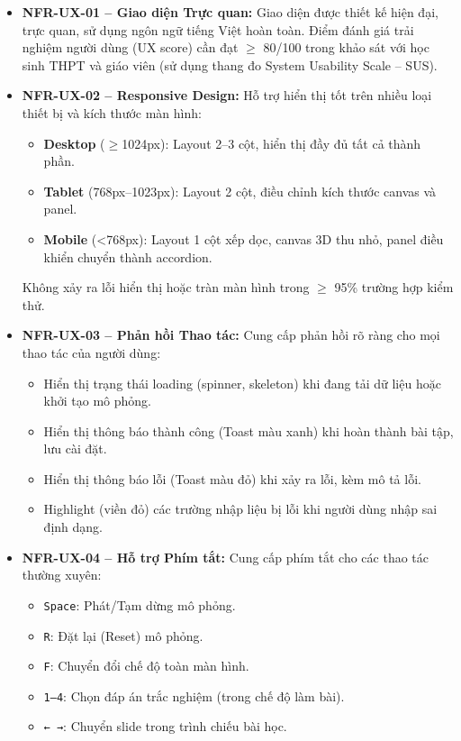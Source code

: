 \begin{itemize}
    \item \textbf{NFR-UX-01 – Giao diện Trực quan:} Giao diện được thiết kế hiện đại, trực quan, sử dụng ngôn ngữ tiếng Việt hoàn toàn. Điểm đánh giá trải nghiệm người dùng (UX score) cần đạt $\geq$ 80/100 trong khảo sát với học sinh THPT và giáo viên (sử dụng thang đo System Usability Scale – SUS).
    
    \item \textbf{NFR-UX-02 – Responsive Design:} Hỗ trợ hiển thị tốt trên nhiều loại thiết bị và kích thước màn hình:
    \begin{itemize}
        \item \textbf{Desktop} ($\geq$1024px): Layout 2–3 cột, hiển thị đầy đủ tất cả thành phần.
        \item \textbf{Tablet} (768px–1023px): Layout 2 cột, điều chỉnh kích thước canvas và panel.
        \item \textbf{Mobile} (<768px): Layout 1 cột xếp dọc, canvas 3D thu nhỏ, panel điều khiển chuyển thành accordion.
    \end{itemize}
    Không xảy ra lỗi hiển thị hoặc tràn màn hình trong $\geq$ 95\% trường hợp kiểm thử.
    
    \item \textbf{NFR-UX-03 – Phản hồi Thao tác:} Cung cấp phản hồi rõ ràng cho mọi thao tác của người dùng:
    \begin{itemize}
        \item Hiển thị trạng thái loading (spinner, skeleton) khi đang tải dữ liệu hoặc khởi tạo mô phỏng.
        \item Hiển thị thông báo thành công (Toast màu xanh) khi hoàn thành bài tập, lưu cài đặt.
        \item Hiển thị thông báo lỗi (Toast màu đỏ) khi xảy ra lỗi, kèm mô tả lỗi.
        \item Highlight (viền đỏ) các trường nhập liệu bị lỗi khi người dùng nhập sai định dạng.
    \end{itemize}
    
    \item \textbf{NFR-UX-04 – Hỗ trợ Phím tắt:} Cung cấp phím tắt cho các thao tác thường xuyên:
    \begin{itemize}
        \item \texttt{Space}: Phát/Tạm dừng mô phỏng.
        \item \texttt{R}: Đặt lại (Reset) mô phỏng.
        \item \texttt{F}: Chuyển đổi chế độ toàn màn hình.
        \item \texttt{1--4}: Chọn đáp án trắc nghiệm (trong chế độ làm bài).
        \item \texttt{← →}: Chuyển slide trong trình chiếu bài học.
    \end{itemize}
    

\end{itemize}
